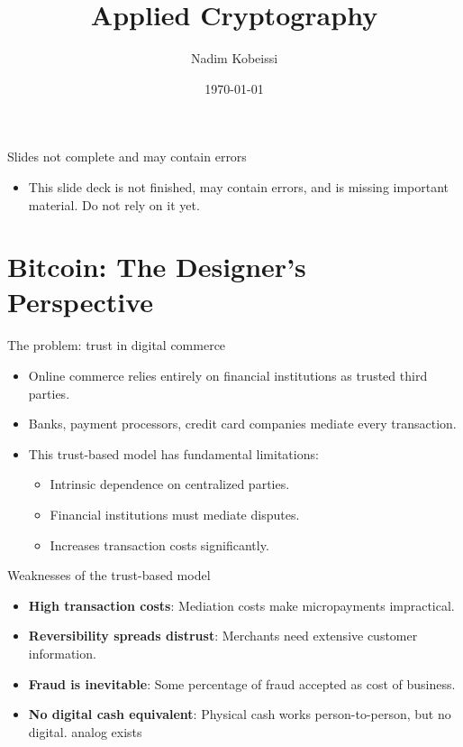 \documentclass[aspectratio=169, lualatex, handout]{beamer}
\title{Applied Cryptography}
\author{Nadim Kobeissi}
\institute{American University of Beirut}
\date{\today}
\begin{document}
\begin{frame}[plain]
	\titlepage
\end{frame}


\begin{frame}{Slides not complete and may contain errors}
	\begin{itemize}
		\item This slide deck is not finished, may contain errors, and is missing important material. Do not rely on it yet.
	\end{itemize}
\end{frame}

\section{Bitcoin: The Designer's Perspective}

\begin{frame}{The problem: trust in digital commerce}
	\begin{itemize}
		\item Online commerce relies entirely on financial institutions as trusted third parties.
		\item Banks, payment processors, credit card companies mediate every transaction.
		\item This trust-based model has fundamental limitations:
		      \begin{itemize}
			      \item Intrinsic dependence on centralized parties.
			      \item Financial institutions must mediate disputes.
			      \item Increases transaction costs significantly.
		      \end{itemize}
	\end{itemize}
\end{frame}

\begin{frame}{Weaknesses of the trust-based model}
	\begin{itemize}
		\item \textbf{High transaction costs}: Mediation costs make micropayments impractical.
		\item \textbf{Reversibility spreads distrust}: Merchants need extensive customer information.
		\item \textbf{Fraud is inevitable}: Some percentage of fraud accepted as cost of business.
		\item \textbf{No digital cash equivalent}: Physical cash works person-to-person, but no digital. analog exists
	\end{itemize}
\end{frame}
\end{document}
